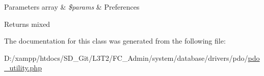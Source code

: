 \begin{DoxyParams}[1]{Parameters}
array & {\em \$params} & Preferences \\
\hline
\end{DoxyParams}
\begin{DoxyReturn}{Returns}
mixed 
\end{DoxyReturn}


The documentation for this class was generated from the following file\+:\begin{DoxyCompactItemize}
\item 
D\+:/xampp/htdocs/\+S\+D\+\_\+\+Git/\+L3\+T2/\+F\+C\+\_\+\+Admin/system/database/drivers/pdo/\hyperlink{pdo__utility_8php}{pdo\+\_\+utility.\+php}\end{DoxyCompactItemize}
